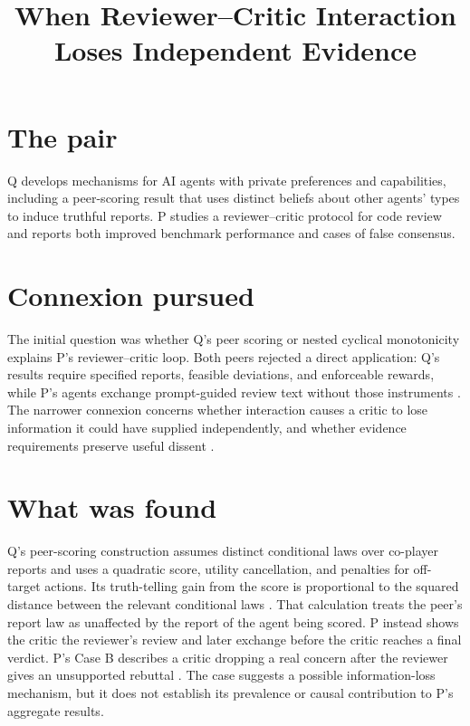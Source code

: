 \documentclass{article}
\title{When Reviewer--Critic Interaction Loses Independent Evidence}
\begin{document}
\maketitle

\section*{The pair}

Q develops mechanisms for AI agents with private preferences and capabilities, including a peer-scoring result that uses distinct beliefs about other agents' types to induce truthful reports. P studies a reviewer--critic protocol for code review and reports both improved benchmark performance and cases of false consensus.

\section*{Connexion pursued}

The initial question was whether Q's peer scoring or nested cyclical monotonicity explains P's reviewer--critic loop. Both peers rejected a direct application: Q's results require specified reports, feasible deviations, and enforceable rewards, while P's agents exchange prompt-guided review text without those instruments . The narrower connexion concerns whether interaction causes a critic to lose information it could have supplied independently, and whether evidence requirements preserve useful dissent .

\section*{What was found}

Q's peer-scoring construction assumes distinct conditional laws over co-player reports and uses a quadratic score, utility cancellation, and penalties for off-target actions. Its truth-telling gain from the score is proportional to the squared distance between the relevant conditional laws . That calculation treats the peer's report law as unaffected by the report of the agent being scored. P instead shows the critic the reviewer's review and later exchange before the critic reaches a final verdict. P's Case B describes a critic dropping a real concern after the reviewer gives an unsupported rebuttal . The case suggests a possible information-loss mechanism, but it does not establish its prevalence or causal contribution to P's aggregate results.
\end{document}
